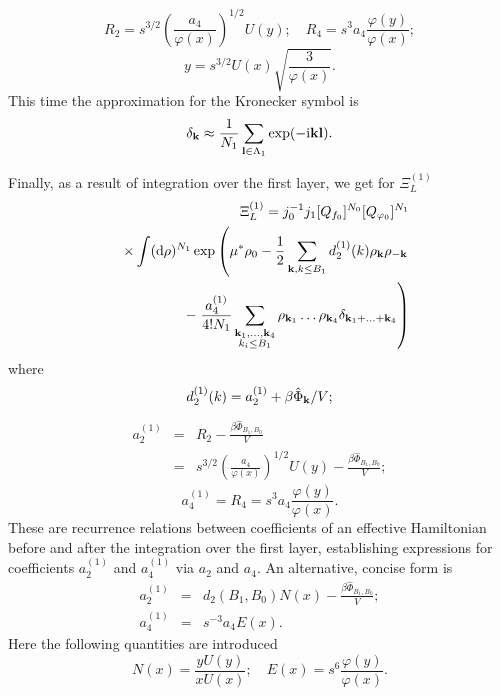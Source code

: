 \begin{equation*}
	R_2 = s^{3/2} \left(\frac{a_4}{\varphi(x)}\right)^{1/2} U(y); \quad R_4 = s^3 a_4 \frac{\varphi(y)}{\varphi(x)};
\end{equation*}
\begin{equation*}
	y = s^{3/2} U(x) \sqrt{\frac{3}{\varphi(x)}}.
\end{equation*}
This time the approximation for the Kronecker symbol is 
\begin{equation*}
	\delta_{\vb k} \approx \frac{1}{N_1} \sum_{\vb l \in \Lambda_1} \exp(-{\rm i} \vb{k} \vb{l}).
\end{equation*}

Finally, as a result of integration over the first layer, we get for $\Xi_L^{(1)}$
\begin{eqnarray*}
	&& \Xi_L^{(1)} = j_0^{-1}j_1 [Q_{f_0}]^{N_0} [Q_{\varphi_0}]^{N_1} 
	\\
	&& \times 
	\int ({\rm d} \rho)^{N_1} \exp
	\left(
	\mu^*\rho_0 - \frac{1}{2} \sum_{\vb k, k \leq B_1} d_2^{(1)}(k) \rho_{\vb k} \rho_{-\vb k}
	\right.
	\nonumber \\
	&& -  
	\left.
	\frac{a_4^{(1)}}{4!N_1} \sum_{\substack{\vb k_1, \dotsc, \vb k_4 \\ k_i \leq B_1}}
	\rho_{\vb k_1} \dotsc \rho_{\vb k_4} \delta_{\vb{k}_1 + \dotsc + \vb{k}_4}
	\right)
	\nonumber
\end{eqnarray*}
where
\begin{equation}
	\label{RR_1_0_d}
	d_2^{(1)}(k) = a_2^{(1)} + \beta\hat{\Phi}_{\vb k} / V;
\end{equation}
\begin{eqnarray}
	\label{RR_1_0_a2}
	a_2^{(1)} & = & R_2 - \frac{\beta\hat{\Phi}_{B_1, B_0}}{V} 
	\\
	& = & s^{3/2} \left(\frac{a_4}{\varphi(x)}\right)^{1/2} U(y)
	- \frac{\beta\hat{\Phi}_{B_1, B_0}}{V};
	\nonumber
\end{eqnarray}
\begin{equation}
	\label{RR_1_0_a4}
	a_4^{(1)} = R_4 = s^3 a_4 \frac{\varphi(y)}{\varphi(x)}.
\end{equation}
These are recurrence relations between coefficients of an effective Hamiltonian before and after the integration over the first layer, establishing expressions for coefficients $a_2^{(1)}$ and $a_4^{(1)}$ via $a_2$ and $a_4$. An alternative, concise form is
\begin{eqnarray}
	\label{RR_1_0_a2_short}
	a_2^{(1)} & = & d_2(B_1, B_0) N(x) - \frac{\beta\hat{\Phi}_{B_1, B_0}}{V};
	\\
	\label{RR_1_0_a4_short}
	a_4^{(1)} & = & s^{-3} a_4 E(x).
\end{eqnarray}
Here the following quantities are introduced
\begin{equation*}
	N(x) = \frac{y U(y)}{x U(x)}; \quad E(x) = s^6 \frac{\varphi(y)}{\varphi(x)}.
\end{equation*}

